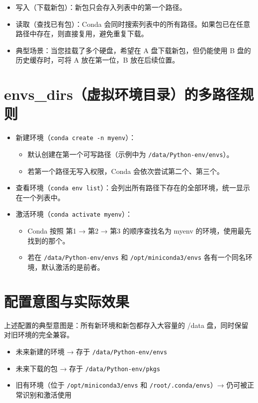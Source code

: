 \documentclass[12pt,UTF8]{ctexbook}
\begin{document}
\begin{itemize}[leftmargin=2cm]
    \item 写入（下载新包）：新包只会存入列表中的第一个路径。
    \item 读取（查找已有包）：Conda 会同时搜索列表中的所有路径。如果包已在任意路径中存在，则直接复用，避免重复下载。
    \item 典型场景：当您挂载了多个硬盘，希望在 A 盘下载新包，但仍能使用 B 盘的历史缓存时，可将 A 放在第一位，B 放在后续位置。
\end{itemize}

\section{envs\_dirs（虚拟环境目录）的多路径规则}
\label{sec:envs_dirs_rules}

\begin{itemize}[leftmargin=2cm]
    \item 新建环境（\texttt{conda create -n myenv}）：
        \begin{itemize}[leftmargin=1cm]
            \item 默认创建在第一个可写路径（示例中为 \texttt{/data/Python-env/envs}）。
            \item 若第一个路径无写入权限，Conda 会依次尝试第二个、第三个。
        \end{itemize}
    \item 查看环境（\texttt{conda env list}）：会列出所有路径下存在的全部环境，统一显示在一个列表中。
    \item 激活环境（\texttt{conda activate myenv}）：
        \begin{itemize}[leftmargin=1cm]
            \item Conda 按照 第1 → 第2 → 第3 的顺序查找名为 myenv 的环境，使用最先找到的那个。
            \item 若在 \texttt{/data/Python-env/envs} 和 \texttt{/opt/miniconda3/envs} 各有一个同名环境，默认激活的是前者。
        \end{itemize}
\end{itemize}

\section{配置意图与实际效果}
\label{sec:config_intent}

上述配置的典型意图是：所有新环境和新包都存入大容量的 /data 盘，同时保留对旧环境的完全兼容。

\begin{itemize}[leftmargin=2cm]
    \item 未来新建的环境 → 存于 \texttt{/data/Python-env/envs}
    \item 未来下载的包 → 存于 \texttt{/data/Python-env/pkgs}
    \item 旧有环境（位于 \texttt{/opt/miniconda3/envs} 和 \texttt{/root/.conda/envs}）→ 仍可被正常识别和激活使用
\end{itemize}
\end{document}
